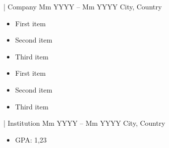 \documentclass[10pt,a4paper,ragged2e,withhyper]{altacv}
\begin{document}
\begin{paracol}{2}
                    {| 
                    {Company} %
                    }
                    {Mm YYYY -- Mm YYYY} %
                    {City, Country} %
                    \begin{itemize}
                            \item {First item} %
                            \item Second item
                            \item Third item
                    \end{itemize}
                    \divider
                
                \begin{itemize}
                    \item First item
                    \item Second item
                    \item Third item
                \end{itemize}
        
                 {| 
                 {Institution} %
                 }
                 {Mm YYYY -- Mm YYYY} %
                 {City, Country} %
                \begin{itemize}
                    \item GPA: 1,23 %
                \end{itemize}
                \divider
            

\end{paracol}
\end{document}
